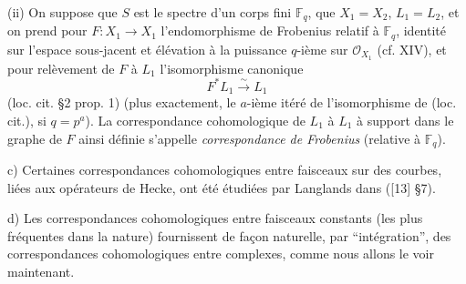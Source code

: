 (ii) On suppose que $S$ est le spectre d'un corps fini $\mathbb{F}_q$, que $X_1=X_2$, $L_1=L_2$, et on prend pour $F:X_1\to X_1$ l'endomorphisme de Frobenius relatif à $\mathbb{F}_q$, identité sur l'espace sous-jacent et élévation à la puissance $q$-ième sur $\mathcal{O}_{X_1}$ (cf. XIV), et pour relèvement de $F$ à $L_1$ l'isomorphisme canonique
\[
F^*L_1\xrightarrow{\sim}L_1
\]
(loc. cit. §2 prop. 1) (plus exactement, le $a$-ième itéré de l'isomorphisme de (loc. cit.), si $q=p^a$). La correspondance cohomologique de $L_1$ à $L_1$ à support dans le graphe de $F$ ainsi définie s'appelle \emph{correspondance de Frobenius} (relative à $\mathbb{F}_q$).

c) Certaines correspondances cohomologiques entre faisceaux sur des courbes, liées aux opérateurs de Hecke, ont été étudiées par Langlands dans ([13] §7).

d) Les correspondances cohomologiques entre faisceaux constants (les plus fréquentes dans la nature) fournissent de façon naturelle, par ``intégration'', des correspondances cohomologiques entre complexes, comme nous allons le voir maintenant.

